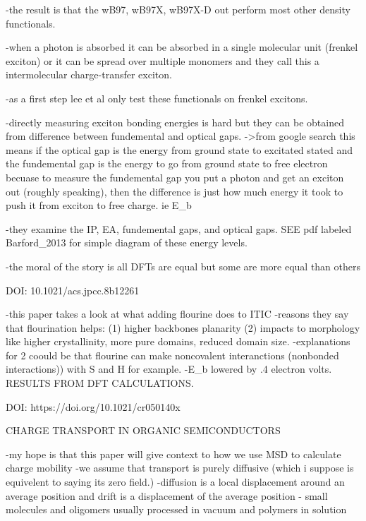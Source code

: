     -the result is that the wB97, wB97X, wB97X-D out perform most other density functionals.

    -when a photon is absorbed it can be absorbed in a single molecular unit (frenkel exciton)
    or it can be spread over multiple monomers and they call this a intermolecular charge-transfer
    exciton. 

    -as a first step lee et al only test these functionals on frenkel excitons. 

    -directly measuring exciton bonding energies is hard but they can be obtained from 
    difference between fundemental and optical gaps. ->from google search this means if the 
    optical gap is the energy from ground state to excitated stated and the fundemental gap
    is the energy to go from ground state to free electron becuase to measure the fundemental 
    gap you put a photon and get an exciton out (roughly speaking), then the difference is just
    how much energy it took to push it from exciton to free charge. ie E_{b}

    -they examine the IP, EA, fundemental gaps, and optical gaps. SEE pdf labeled Barford_2013
    for simple diagram of these energy levels.

    -the moral of the story is all DFTs are equal but some are more equal than others
    

DOI: 10.1021/acs.jpcc.8b12261

    -this paper takes a look at what adding flourine does to ITIC
    -reasons they say that flourination helps: (1) higher backbones planarity
    (2) impacts to morphology like higher crystallinity, more pure domains, reduced domain size.
    -explanations for 2 coould be that flourine can make noncovalent interanctions (nonbonded interactions))
    with S and H for example. 
    -E_{b} lowered by .4 electron volts. RESULTS FROM DFT CALCULATIONS. 


DOI: https://doi.org/10.1021/cr050140x

        CHARGE TRANSPORT IN ORGANIC SEMICONDUCTORS

    -my hope is that this paper will give context to how we use MSD to calculate charge mobility
    -we assume that transport is purely diffusive (which i suppose is equivelent to saying its 
    zero field.) 
    -diffusion is a local displacement around an average position and drift is a displacement of 
    the average position
    - small molecules and oligomers usually processed in vacuum and polymers in solution
    
